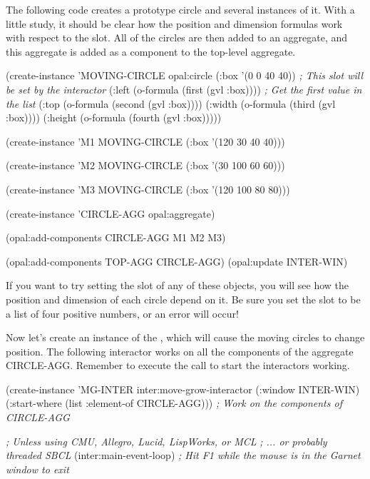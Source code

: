 The following code creates a prototype circle and several instances of
it.  With a little study, it should be clear how the position and dimension
formulas work with respect to the  slot.  All of the circles
are then added to an aggregate, and this aggregate is added as a
component to the top-level aggregate.

\begin{programexample}
(create-instance 'MOVING-CIRCLE opal:circle
   (:box '(0 0 40 40))  {\it ; This slot will be set by the interactor}
   (:left (o-formula (first (gvl :box))))     {\it ; Get the first value in the list}
   (:top (o-formula (second (gvl :box))))
   (:width (o-formula (third (gvl :box))))
   (:height (o-formula (fourth (gvl :box)))))

(create-instance 'M1 MOVING-CIRCLE
   (:box '(120 30 40 40)))

(create-instance 'M2 MOVING-CIRCLE
   (:box '(30 100 60 60)))

(create-instance 'M3 MOVING-CIRCLE
   (:box '(120 100 80 80)))

(create-instance 'CIRCLE-AGG opal:aggregate)

(opal:add-components CIRCLE-AGG M1 M2 M3)		

(opal:add-components TOP-AGG CIRCLE-AGG)
(opal:update INTER-WIN)
\end{programexample}

If you want to try setting the  slot of any of these objects,
you will see how the position and dimension of each circle depend on
it.  Be sure you set the  slot to be a list of four positive
numbers, or an error will occur!

Now let's create an instance of the , which
will cause the moving circles to change position.  The following
interactor works on all the components of the aggregate CIRCLE-AGG.
Remember to execute the  call to start the
interactors working.

\begin{programexample}
(create-instance 'MG-INTER inter:move-grow-interactor
   (:window INTER-WIN)
   (:start-where (list :element-of CIRCLE-AGG)))    {\it ; Work on the components of CIRCLE-AGG}

{\it ; Unless using CMU, Allegro, Lucid, LispWorks, or MCL}
\textit{; ... or probably threaded SBCL}
(inter:main-event-loop)
{\it ; Hit F1 while the mouse is in the Garnet window to exit}
\end{programexample}

